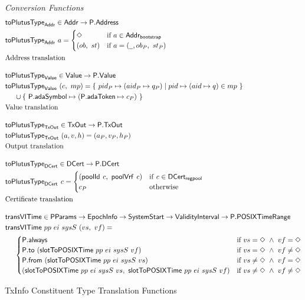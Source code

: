 \begin{figure*}[htb]
  \emph{Conversion Functions}
  \begin{align*}
    & \fun{toPlutusType}_{\Addr} \in \Addr  \to  \type{P.Address} \\
    & \fun{toPlutusType}_{\Addr} ~a = \begin{cases}
      \Nothing & \text{if}~a \in \AddrBS \\
      (ob,~st) & \text{if}~a = (\wcard, ob_P,~st_P)
    \end{cases} \\
    & \text{Address translation}
    \nextdef
    & \fun{toPlutusType}_{\Value} \in \Value \to \type{P.Value} \\
    & \fun{toPlutusType}_{\Value}~ (c,~ mp) = \{~ pid_P\mapsto (aid_P \mapsto q_P) \mid pid \mapsto (aid \mapsto q) \in mp ~\} \\
    & ~~~~\cup \{~\type{P.adaSymbol}\mapsto (\type{P.adaToken} \mapsto c_P) ~\} \\
    & \text{Value translation}
    \nextdef
    & \fun{toPlutusType}_{\TxOut} \in \TxOut \to \type{P.TxOut} \\
    & \fun{toPlutusType}_{\TxOut}~ (a, v, h) = (a_P, v_P, h_P) \\
    & \text{Output translation}
    \nextdef
    & \fun{toPlutusType}_{\DCert} \in \DCert \to \type{P.DCert} \\
    & \fun{toPlutusType}_{\DCert}~\var{c} = \begin{cases}
      (\fun{poolId}~\var{c},~\fun{poolVrf}~\var{c}) & \text{if } \var{c}\in \DCertRegPool \\
      c_P & \text{otherwise}
      \end{cases} \\
    & \text{Certificate translation}
    \nextdef
    & \fun{transVITime} \in \PParams \to \EpochInfo \to \SystemStart \to \ValidityInterval \to \type{P.POSIXTimeRange} \\
    & \fun{transVITime} ~pp ~ei~ sysS~ (vs,~ vf) = \\
    &  ~~~~ \begin{cases}
        \type{P.always} & \text{if } vs = \Nothing ~\wedge~ vf = \Nothing \\
        \type{P.to}~(\fun{slotToPOSIXTime}~pp~ei~sysS~vf) & \text{if } vs = \Nothing ~\wedge~ vf \neq \Nothing \\
        \type{P.from}~(\fun{slotToPOSIXTime}~pp~ei~sysS~vs) & \text{if } vs \neq \Nothing ~\wedge~ vf = \Nothing \\
        (\fun{slotToPOSIXTime}~pp~ei~sysS~vs,~\fun{slotToPOSIXTime}~pp~ei~sysS~vf) & \text{if } vs \neq \Nothing ~\wedge~ vf \neq \Nothing \\
      \end{cases} \\
  \end{align*}
  \caption{TxInfo Constituent Type Translation Functions}
  \label{fig:txinfo-translations}
\end{figure*}

